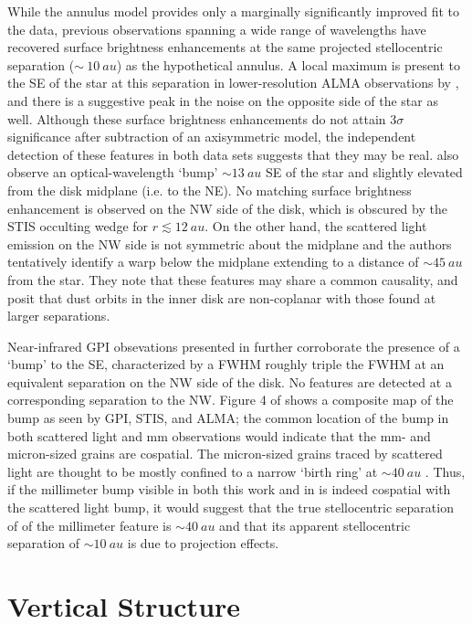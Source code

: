 \documentclass[12pt,oneside]{book}
\begin{document}
While the annulus model provides only a marginally significantly improved fit to the data, previous observations spanning a wide range of wavelengths have recovered surface brightness enhancements at the same projected stellocentric separation ($\sim~\SI{10}{au}$) as the hypothetical annulus.
A local maximum is present to the SE of the star at this separation in lower-resolution ALMA observations by \cite{macgregor13}, and there is a suggestive peak in the noise on the opposite side of the star as well.
Although these surface brightness enhancements do not attain $3 \sigma$ significance after subtraction of an axisymmetric model, the independent detection of these features in both data sets suggests that they may be real.  
\cite{schneider14} also observe an optical-wavelength `bump' $\sim \SI{13}{au}$ SE of the star and slightly elevated from the disk midplane (i.e. to the NE).
No matching surface brightness enhancement is observed on the NW side of the disk, which is obscured by the STIS occulting wedge for $r \lesssim \SI{12}{au}$.
On the other hand, the scattered light emission on the NW side is not symmetric about the midplane and the authors tentatively identify a warp below the midplane extending to a distance of $\sim \SI{45}{au}$ from the star.
They note that these features may share a common causality, and posit that dust orbits in the inner disk are non-coplanar with those found at larger separations.

Near-infrared GPI obsevations presented in \cite{wang15} further corroborate the presence of a `bump' to the SE, characterized by a FWHM roughly triple the FWHM at an equivalent separation on the NW side of the disk. 
No features are detected at a corresponding separation to the NW.
Figure 4 of \cite{wang15} shows a composite map of the bump as seen by GPI, STIS, and ALMA; the common location of the bump in both scattered light and mm observations would indicate that the mm- and micron-sized grains are cospatial.
The micron-sized grains traced by scattered light are thought to be mostly confined to a narrow `birth ring' at $\sim \SI{40}{au}$ \citep{strubbe&chiang06}. 
Thus, if the millimeter bump visible in both this work and in \cite{macgregor13} is indeed cospatial with the scattered light bump, it would suggest that the true stellocentric separation of of the millimeter feature is $\sim \SI{40}{au}$ and that its apparent stellocentric separation of $\sim \SI{10}{au}$ is due to projection effects.

\section{Vertical Structure}
\label{section: vertical discussion}
\end{document}

